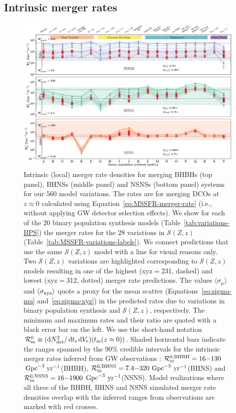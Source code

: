 \documentclass[fleqn,usenatbib]{mnras}
\newcommand\rate{\mathcal{R}}
\newcommand{\yearmin}{\ensuremath{\,\rm{yr}^{-1}}\xspace}
\newcommand{\GpcminThree}{\ensuremath{\,\rm{Gpc}^{-3}}\xspace}
\newcommand{\SFRD}{\ensuremath{\mathcal{S}(Z,z)}\xspace}
\newcommand{\ts}{\ensuremath{{t}_{\rm{s}}}\xspace}
\newcommand{\tmerger}{\ensuremath{{t}_{\rm{m}}}\xspace}
\newcommand{\Ndet}{\ensuremath{{N}_{\rm{det}}}\xspace}
\newcommand{\Vc}{\ensuremath{{V}_{\rm{c}}}\xspace}
\newcommand*\diff{\mathop{}\!\mathrm{d}}
\newcommand{\Nmodels}{\ensuremath{560}\xspace}
\newcommand{\NmodelsBPS}{\ensuremath{20}\xspace}
\newcommand{\NmodelsMSSFR}{\ensuremath{28}\xspace}
\newcommand{\RateGWTCmaxBHBH}{\ensuremath{130}\xspace}
\newcommand{\RateGWTCminBHBH}{\ensuremath{16}\xspace}
\newcommand{\RateGWTCmaxBHNS}{\ensuremath{320}\xspace}
\newcommand{\RateGWTCminBHNS}{\ensuremath{7.4}\xspace}
\newcommand{\RateGWTCmaxNSNS}{\ensuremath{1900}\xspace}
\newcommand{\RateGWTCminNSNS}{\ensuremath{16}\xspace}
\begin{document}
\subsection{Intrinsic merger rates}
\label{sec:results-comparing-BBH-BNS-intrinsic-rates}

\begin{figure}
    \centering
\includegraphics[width=1.0\textwidth]{figures/Rates_intrinsic_with_GWTC3.pdf} 
    \caption{Intrinsic (local) merger rate densities for merging \acp{BHBH} (top panel), \acp{BHNS} (middle panel) and \acp{NSNS} (bottom panel) systems for our \Nmodels model variations. The rates are for merging \acp{DCO} at $z\approx0$ calculated using Equation~\ref{eq:MSSFR-merger-rate} (i.e., without applying \ac{GW} detector selection effects).    We show for each of the \NmodelsBPS binary population synthesis models (Table~\ref{tab:variations-BPS}) the merger rates for the \NmodelsMSSFR variations in \SFRD (Table~\ref{tab:MSSFR-variations-labels}). We connect predictions that use the same \SFRD model with a line for visual reasons only. Two \SFRD variations are highlighted  corresponding to \SFRD models resulting in one of the highest  (\rm{xyz}$=$231, dashed) and lowest  (\rm{xyz}$=$312, dotted) merger rate predictions. The values $\langle \sigma_{\mu}\rangle$ and $\langle \sigma_{\rm{xyz}}\rangle$ quote a proxy for the mean scatter (Equations~\ref{eq:sigma-mu} and~\ref{eq:sigma-xyz}) in the predicted rates due to variations in binary population synthesis and \SFRD, respectively.      The minimum and maximum rates and their ratio  are quoted with a black error bar on the left.  We use the short-hand notation $\rate_{\rm{m}}^0 \equiv (\diff \Ndet^2 / \diff \ts \diff \Vc)(\tmerger(z\approx0))$.      Shaded horizontal bars indicate the ranges spanned by the  $90\%$ credible intervals for the intrinsic merger rates inferred from GW observations  \citet{Abbott:2021GWTC3pop}:   $\rate_{\rm{m}}^{0,\rm{BHBH}}= \RateGWTCminBHBH{-}\RateGWTCmaxBHBH$\GpcminThree\yearmin  (\ac{BHBH}),  $\rate_{\rm{m}}^{0,\rm{BHNS}} = \RateGWTCminBHNS{-}\RateGWTCmaxBHNS$\GpcminThree\yearmin (\ac{BHNS}) and  $\rate_{\rm{m}}^{0,\rm{NSNS}}  =  \RateGWTCminNSNS{-}\RateGWTCmaxNSNS$\GpcminThree\yearmin  (\ac{NSNS}).    Model realizations where all three of the \ac{BHBH}, \ac{BHNS} and \ac{NSNS} simulated merger rate densities overlap with the inferred ranges from  observations are marked with red crosses. 
}
\end{figure}
\end{document}
